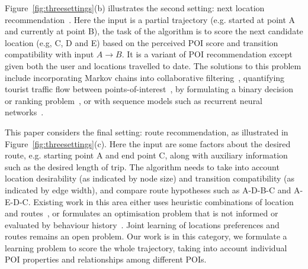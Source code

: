 Figure~\ref{fig:threesettings}(b) illustrates the second setting: next location recommendation~\cite{ijcai13,aaai16,baraglia2013learnext,zhang2015location}. Here the input is a partial trajectory (e.g. started at point A and currently at point B), the task of the algorithm is to score the next candidate location (e.g, C, D and E) based on the perceived POI score and transition compatibility with input $A\rightarrow B$.
It is a variant of POI recommendation except given both the user and locations travelled to date. The solutions to this problem include incorporating Markov chains into collaborative filtering~\cite{fpmc10,ijcai13,zhang2015location},
quantifying tourist traffic flow between points-of-interest~\cite{zheng2012patterns},
by formulating a binary decision or ranking problem~\cite{baraglia2013learnext}, or with sequence models such as recurrent neural networks~\cite{aaai16}.



This paper considers the final setting: route recommendation, as illustrated in Figure~\ref{fig:threesettings}(c). Here the input are some factors about the desired route, e.g. starting point A and end point C, along with auxiliary information such as the desired length of trip. The algorithm needs to take into account location desirability (as indicated by node size) and transition compatibility (as indicated by edge width), and compare route hypotheses such as A-D-B-C and A-E-D-C. Existing work in this area either uses heuristic combinations of location and routes~\cite{lu2010photo2trip,ijcai15,lu2012personalized}, or formulates an optimisation problem that is not informed or evaluated by behaviour history~\cite{gioniswsdm14,chen2015tripplanner}. Joint learning of locations preferences and routes remains an open problem.
Our work is in this category, we formulate a learning problem to score the whole trajectory, taking into account individual POI properties and relationships among different POIs.



